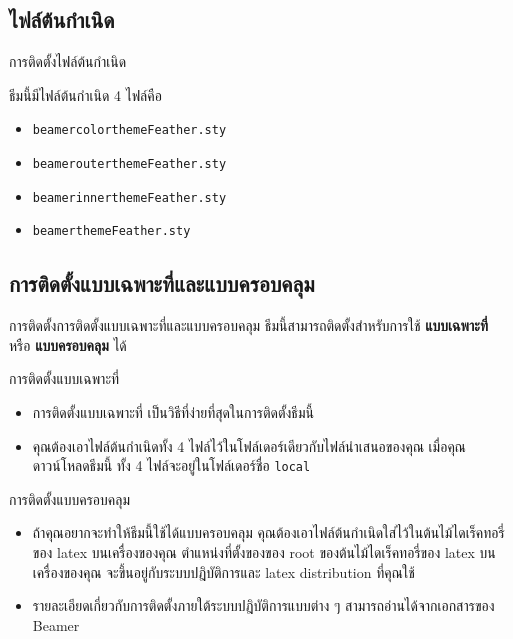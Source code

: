 \documentclass[10pt,xcolor={dvipsnames}]{beamer}
\begin{document}
\subsection{ไฟล์ต้นกำเนิด}
\begin{frame}{การติดตั้ง}{ไฟล์ต้นกำเนิด}

\begin{block}{}
ธีมนี้มีไฟล์ต้นกำเนิด 4 ไฟล์คือ
  \begin{itemize}
    \item {\tt beamercolorthemeFeather.sty}
    \item {\tt beamerouterthemeFeather.sty}
    \item {\tt beamerinnerthemeFeather.sty}
    \item {\tt beamerthemeFeather.sty}
  \end{itemize}
\end{block}
\end{frame}

\subsection{การติดตั้งแบบเฉพาะที่และแบบครอบคลุม}
\begin{frame}[shrink]{การติดตั้ง}{การติดตั้งแบบเฉพาะที่และแบบครอบคลุม}
  ธีมนี้สามารถติดตั้งสำหรับการใช้  \textbf{แบบเฉพาะที่} หรือ \textbf{แบบครอบคลุม} ได้
  \pause
  \begin{block}{การติดตั้งแบบเฉพาะที่}
  \begin{itemize}    
    \item การติดตั้งแบบเฉพาะที่ เป็นวิธีที่ง่ายที่สุดในการติดตั้งธีมนี้ 
    \item คุณต้องเอาไฟล์ต้นกำเนิดทั้ง  4 ไฟล์ไว้ในโฟล์เดอร์เดียวกับไฟล์นำเสนอของคุณ เมื่อคุณดาวน์โหลดธีมนี้ ทั้ง 4 ไฟล์จะอยู่ในโฟล์เดอร์ชื่อ {\tt local}
  \end{itemize}
  \end{block}
  \pause
  \begin{block}{การติดตั้งแบบครอบคลุม}
  \begin{itemize}
     \item ถ้าคุณอยากจะทำให้ธีมนี้ใช้ได้แบบครอบคลุม คุณต้องเอาไฟล์ต้นกำเนิดใส่ไว้ในต้นไม้ไดเร็คทอรี่ของ latex บนเครื่องของคุณ ตำแหน่งที่ตั้งของของ root ของต้นไม้ไดเร็คทอรี่ของ latex บนเครื่องของคุณ จะขึ้นอยู่กับระบบปฎิบัติการและ latex distribution ที่คุณใช้ 
     \item รายละเอียดเกี่ยวกับการติดตั้งภายใต้ระบบปฎิบัติการแบบต่าง ๆ สามารถอ่านได้จากเอกสารของ Beamer
  \end{itemize}
  \end{block}
\end{frame}
     
\end{document}
